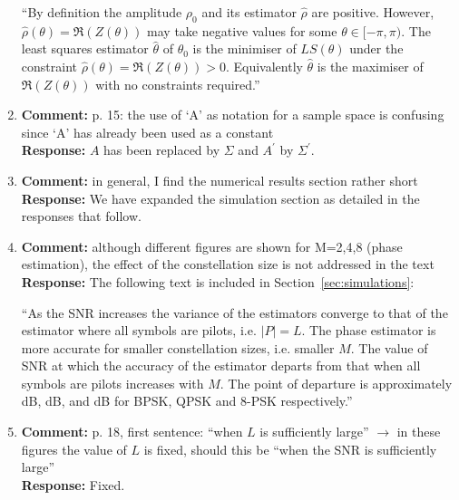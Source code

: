 \documentclass{article}
\newcommand{\abs}[1]{{\left\vert #1 \right\vert}}
\begin{document}
\begin{enumerate}
``By definition the amplitude $\rho_0$ and its estimator $\hat{\rho}$ are positive.  However, $\hat{\rho}(\theta) = \Re(Z(\theta))$ may take negative values for some $\theta \in [-\pi,\pi)$.  The least squares estimator $\hat{\theta}$ of $\theta_0$ is the minimiser of $LS(\theta)$ under the constraint $\hat{\rho}(\theta) = \Re(Z(\theta)) > 0$.  Equivalently $\hat{\theta}$ is the maximiser of $\Re(Z(\theta))$ with no constraints required.''

\item \textbf{Comment:} p. 15: the use of `A' as notation for a sample space is confusing since `A' has already been used as a constant \\
\textbf{Response:} $A$ has been replaced by $\Sigma$ and $A^\prime$ by $\Sigma^\prime$.

\item \textbf{Comment:} in general, I find the numerical results section rather short \\
\textbf{Response:} We have expanded the simulation section as detailed in the responses that follow.

\item \textbf{Comment:} although different figures are shown for M=2,4,8 (phase estimation), the effect of the constellation size is not addressed in the text  \\
\textbf{Response:}  The following text is included in Section~\ref{sec:simulations}:

``As the SNR increases the variance of the estimators converge to that of the estimator where all symbols are pilots, i.e. $\abs{P} = L$.  The phase estimator is more accurate for smaller constellation sizes, i.e. smaller $M$. The value of SNR at which the accuracy of the estimator departs from that when all symbols are pilots increases with $M$.  The point of departure is approximately \unit[0]{dB}, \unit[6]{dB}, and \unit[13]{dB} for BPSK, QPSK and $8$-PSK respectively.''


\item \textbf{Comment:} p. 18, first sentence: ``when $L$ is sufficiently large'' $\to$ in these figures the value of $L$ is fixed, should this be ``when the SNR is sufficiently large''  \\
\textbf{Response:} Fixed.


\end{enumerate}
\end{document}
